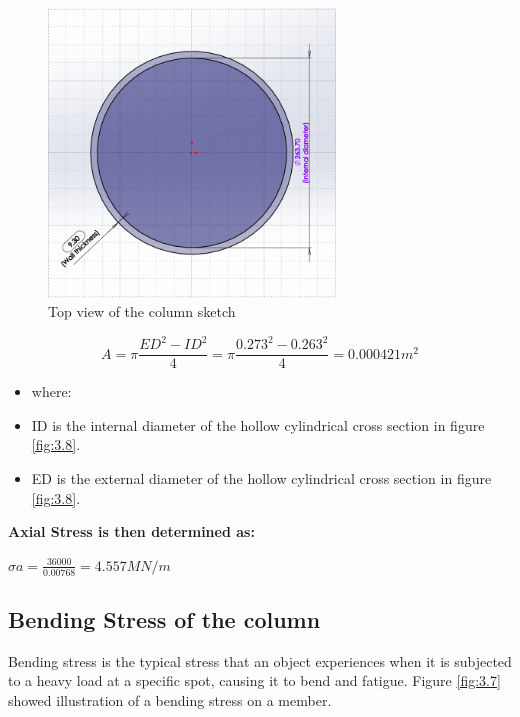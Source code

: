 {\begin{figure}[htp]
    \centering
    \includegraphics[width=3in]{Figures/Top_view_of_the_column.png}
    \caption{Top view of the column sketch}
    \label{fig:3.6}
\end{figure}

\begin{equation}
A = {\pi}\frac{{{ED}}^{2} - {{ID}}^{2}}{{4}}  = {\pi}\frac{{{0}.{273}}^{2} - {{0}.{263}}^{2}}{{4}}  = 0.000421{m}^{2}
\end{equation}

\begin{itemize}[label={}]
    \item where: 
    \item ID is the internal diameter of the hollow cylindrical cross section in figure \ref{fig:3.8}.
    \item ED is the external diameter of the hollow cylindrical cross section in figure \ref{fig:3.8}.

\end{itemize}

\textbf{Axial Stress is then determined as:}



\begin{center}
    \(\sigma a = \frac{{36000}}{{0.00768}} = 4.557MN/m\)
\end{center}


 \subsection{Bending Stress of the column} 
Bending stress is the typical stress that an object experiences when it is subjected to a heavy load at a specific spot, causing it to bend and fatigue. Figure \ref{fig:3.7} showed illustration of a bending stress on a member.
 
}
